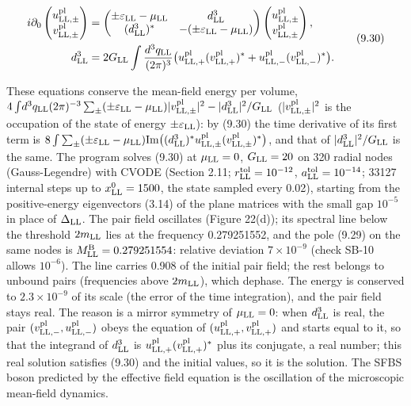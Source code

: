 \documentclass[
  10pt,
]{article}
\begin{document}
\[\begin{aligned}i\partial_0\begin{pmatrix}u^{\rm pl}_{{\rm LL},\pm}\\v^{\rm pl}_{{\rm LL},\pm}\end{pmatrix}&=\begin{pmatrix}\pm\varepsilon_{\rm LL}-\mu_{\rm LL}&d^3_{\rm LL}\\(d^3_{\rm LL})^*&-(\pm\varepsilon_{\rm LL}-\mu_{\rm LL})\end{pmatrix}\begin{pmatrix}u^{\rm pl}_{{\rm LL},\pm}\\v^{\rm pl}_{{\rm LL},\pm}\end{pmatrix},\\d^3_{\rm LL}&=2G_{\rm LL}\int\frac{d^3q_{\rm LL}}{(2\pi)^3}\big(u^{\rm pl}_{{\rm LL},+}(v^{\rm pl}_{{\rm LL},+})^*+u^{\rm pl}_{{\rm LL},-}(v^{\rm pl}_{{\rm LL},-})^*\big).\end{aligned}\tag{9.30}\]

These equations conserve the mean-field energy per volume,
\(4\int\!d^3q_{\rm LL}(2\pi)^{-3}\sum_\pm(\pm\varepsilon_{\rm LL}-\mu_{\rm LL})\lvert v^{\rm pl}_{{\rm LL},\pm}\rvert^2-\lvert d^3_{\rm LL}\rvert^2/G_{\rm LL}\)
(\(\lvert v^{\rm pl}_{{\rm LL},\pm}\rvert^2\) is the occupation of the
state of energy \(\pm\varepsilon_{\rm LL}\)): by (9.30) the time
derivative of its first term is
\(8\int\sum_\pm(\pm\varepsilon_{\rm LL}-\mu_{\rm LL}){\rm Im}\big((d^3_{\rm LL})^*u^{\rm pl}_{{\rm LL},\pm}(v^{\rm pl}_{{\rm LL},\pm})^*\big)\),
and that of \(\lvert d^3_{\rm LL}\rvert^2/G_{\rm LL}\) is the same. The
program solves (9.30) at \(\mu_{\rm LL}=0\), \(G_{\rm LL}=20\) on 320
radial nodes (Gauss-Legendre) with CVODE (Section 2.11;
\(r^{\rm tol}_{\rm LL}=10^{-12}\), \(a^{\rm tol}_{\rm LL}=10^{-14}\);
33127 internal steps up to \(x^0_{\rm LL}=1500\), the state sampled
every 0.02), starting from the positive-energy eigenvectors (3.14) of
the plane matrices with the small gap \(10^{-5}\) in place of
\(\Delta_{\rm LL}\). The pair field oscillates (Figure 22(d)); its
spectral line below the threshold \(2m_{\rm LL}\) lies at the frequency
0.279251552, and the pole (9.29) on the same nodes is
\(M^{\rm B}_{\rm LL}=0.279251554\): relative deviation
\(7\times10^{-9}\) (check SB-10 allows \(10^{-6}\)). The line carries
0.908 of the initial pair field; the rest belongs to unbound pairs
(frequencies above \(2m_{\rm LL}\)), which dephase. The energy is
conserved to \(2.3\times10^{-9}\) of its scale (the error of the time
integration), and the pair field stays real. The reason is a mirror
symmetry of \(\mu_{\rm LL}=0\): when \(d^3_{\rm LL}\) is real, the pair
\((v^{\rm pl}_{{\rm LL},-},u^{\rm pl}_{{\rm LL},-})\) obeys the equation
of \((u^{\rm pl}_{{\rm LL},+},v^{\rm pl}_{{\rm LL},+})\) and starts
equal to it, so that the integrand of \(d^3_{\rm LL}\) is
\(u^{\rm pl}_{{\rm LL},+}(v^{\rm pl}_{{\rm LL},+})^*\) plus its
conjugate, a real number; this real solution satisfies (9.30) and the
initial values, so it is the solution. The SFBS boson predicted by the
effective field equation is the oscillation of the microscopic
mean-field dynamics.
\end{document}
